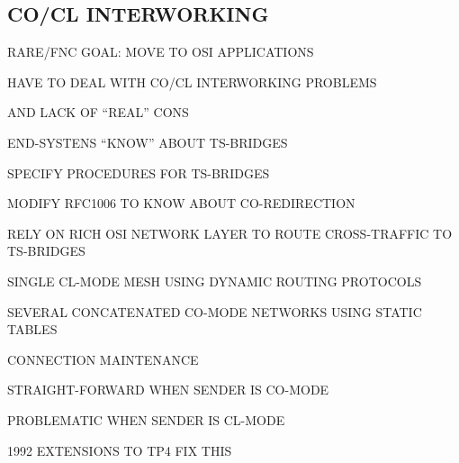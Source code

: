 \begin{bwslide}
\part*	{CO/CL INTERWORKING}\bf

\begin{nrtc}
\item	RARE/FNC GOAL: MOVE TO OSI APPLICATIONS

\item	HAVE TO DEAL WITH CO/CL INTERWORKING PROBLEMS
    \begin{nrtc}
    \item	AND LACK OF ``REAL'' CONS
    \end{nrtc}
\end{nrtc}
\end{bwslide}




\begin{bwslide}

\begin{nrtc}
\item	END-SYSTENS ``KNOW'' ABOUT TS-BRIDGES

\item	SPECIFY PROCEDURES FOR TS-BRIDGES

\item	MODIFY RFC1006 TO KNOW ABOUT CO-REDIRECTION
\end{nrtc}
\end{bwslide}


\begin{bwslide}

\begin{nrtc}
\item	RELY ON RICH OSI NETWORK LAYER TO ROUTE CROSS-TRAFFIC TO TS-BRIDGES
    \begin{nrtc}
    \item	SINGLE CL-MODE MESH USING DYNAMIC ROUTING PROTOCOLS

    \item	SEVERAL CONCATENATED CO-MODE NETWORKS USING STATIC TABLES
    \end{nrtc}

\item	CONNECTION MAINTENANCE
    \begin{nrtc}
    \item	STRAIGHT-FORWARD WHEN SENDER IS CO-MODE

    \item	PROBLEMATIC WHEN SENDER IS CL-MODE
	\begin{nrtc}
	\item	1992 EXTENSIONS TO TP4 FIX THIS
	\end{nrtc}
    \end{nrtc}
\end{nrtc}
\end{bwslide}


